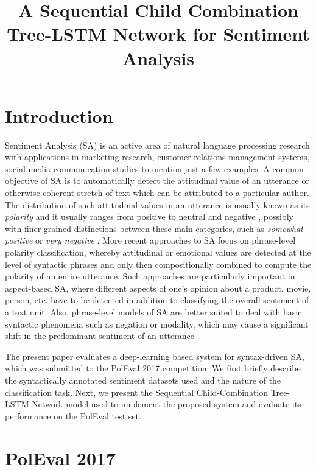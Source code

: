 \documentclass[10pt, a4paper]{article}
\title{A Sequential Child Combination Tree-LSTM Network for Sentiment Analysis}
\begin{document}
\maketitleabstract

\section{Introduction}   
Sentiment Analysis (SA) is an active area of natural language processing research with applications in marketing research, customer relations management systems, social media communication studies to mention just a few examples. A common objective of SA is to automatically detect the attitudinal value of an utterance or otherwise coherent stretch of text which can be attributed to a particular author. The distribution of  such attitudinal values in an utterance is usually known as its \textit{polarity} and it usually ranges from positive to neutral and negative \cite{cambria_schuller}, possibly with finer-grained distinctions between these main categories, such as \textit{somewhat positive} or \textit{very negative} \cite{socher2013recursive}. More recent approaches to SA focus on phrase-level polarity classification, whereby attitudinal or emotional values are detected at the level of syntactic phrases and only then compositionally combined to compute the polarity of an entire utterance. Such approaches are particularly important in aspect-based SA, where different aspects of one's opinion about a product, movie, person, etc. have to be detected in addition to  classifying the overall sentiment of a text unit. Also, phrase-level models of SA are better suited to deal with basic syntactic phenomena such as negation or modality, which may cause a significant shift in the predominant sentiment of an utterance \cite{wilson_wiebe}. 
\par The present paper evaluates a deep-learning based system for syntax-driven SA, which was submitted to the PolEval 2017 competition. We first briefly describe the syntactically annotated sentiment datasets used and the nature of the classification task. Next, we present the Sequential Child-Combination Tree-LSTM Network model used to implement the proposed system and evaluate its performance on the PolEval test set.


\section{PolEval 2017}
\end{document}
